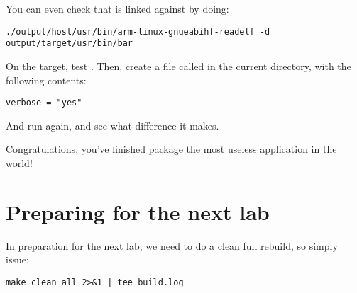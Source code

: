 You can even check that  is linked against
 by doing:

\begin{verbatim}
./output/host/usr/bin/arm-linux-gnueabihf-readelf -d output/target/usr/bin/bar
\end{verbatim}

On the target, test . Then, create a file called
 in the current directory, with the following contents:

\begin{verbatim}
verbose = "yes"
\end{verbatim}

And run  again, and see what difference it makes.

Congratulations, you've finished package the most useless application
in the world!

\section{Preparing for the next lab}

In preparation for the next lab, we need to do a clean full rebuild,
so simply issue:

\begin{verbatim}
make clean all 2>&1 | tee build.log
\end{verbatim}
